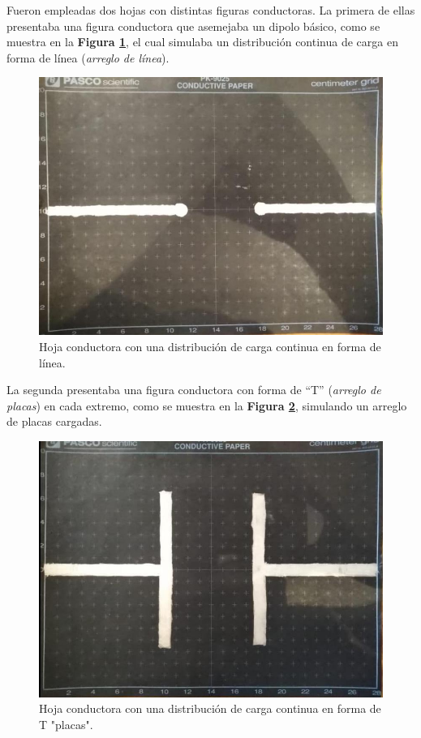 \documentclass[letterpaper, 11 pt]{article}
\begin{document}
\begin{multicols}{2}
Fueron empleadas dos hojas con distintas figuras conductoras. La primera de ellas presentaba una figura conductora que asemejaba un dipolo básico, como se muestra en la \textbf{Figura \ref{hoja1}}, el cual simulaba un distribución continua de carga en forma de línea (\textit{arreglo de línea}). 

\begin{figure}[H]
    \centering
    \captionsetup{justification=centering,margin=0.5cm}
    \includegraphics[scale=0.25]{wannabeyoursivonne.jpeg}
    \caption{Hoja conductora con una distribución de carga continua en forma de línea.}
    \label{hoja1}
\end{figure}

La segunda presentaba una figura conductora con forma de “T” (\textit{arreglo de placas}) en cada extremo, como se muestra en la \textbf{Figura \ref{hoja 2}}, simulando un arreglo de placas cargadas.

\begin{figure}[H]
    \centering
    \captionsetup{justification=centering,margin=0.5cm}
    \includegraphics[scale=0.25]{andaconmigoivonne.jpeg}
    \caption{Hoja conductora con una distribución de carga continua en forma de T "placas".}
    \label{hoja 2}
\end{figure}


\end{multicols}
\end{document}
